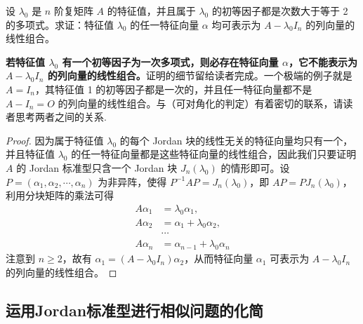 \documentclass[../../main.tex]{subfiles}%
\begin{document}
\begin{proposition}\label{proposition:列向量的线性组合}
设 $\lambda_0$ 是 $n$ 阶复矩阵 $A$ 的特征值，并且属于 $\lambda_0$ 的初等因子都是次数大于等于 2 的多项式。求证：特征值 $\lambda_0$ 的任一特征向量 $\alpha$ 均可表示为 $A - \lambda_0I_n$ 的列向量的线性组合。
\end{proposition}
\begin{remark}
\textbf{若特征值 $\lambda_0$ 有一个初等因子为一次多项式，则必存在特征向量 $\alpha$，它不能表示为 $A - \lambda_0I_n$ 的列向量的线性组合。}证明的细节留给读者完成。一个极端的例子就是 $A = I_n$，其特征值 1 的初等因子都是一次的，并且任一特征向量都不是 $A - I_n = O$ 的列向量的线性组合。与（可对角化的判定）有着密切的联系，请读者思考两者之间的关系.
\end{remark}
\begin{proof}
因为属于特征值 $\lambda_0$ 的每个 Jordan 块的线性无关的特征向量均只有一个，并且特征值 $\lambda_0$ 的任一特征向量都是这些特征向量的线性组合，因此我们只要证明 $A$ 的 Jordan 标准型只含一个 Jordan 块 $J_n(\lambda_0)$ 的情形即可。设 $P = (\alpha_1,\alpha_2,\cdots,\alpha_n)$ 为非异阵，使得 $P^{-1}AP = J_n(\lambda_0)$，即 $AP = PJ_n(\lambda_0)$，利用分块矩阵的乘法可得
\begin{align*}
A\alpha_1 &= \lambda_0\alpha_1,\\
A\alpha_2 &= \alpha_1 + \lambda_0\alpha_2,\\
&\cdots\\
A\alpha_n &= \alpha_{n - 1} + \lambda_0\alpha_n
\end{align*}
注意到 $n \geqslant  2$，故有 $\alpha_1 = (A - \lambda_0I_n)\alpha_2$，从而特征向量 $\alpha_1$ 可表示为 $A - \lambda_0I_n$ 的列向量的线性组合。
\end{proof}



\subsection{运用Jordan标准型进行相似问题的化简}
\end{document}

